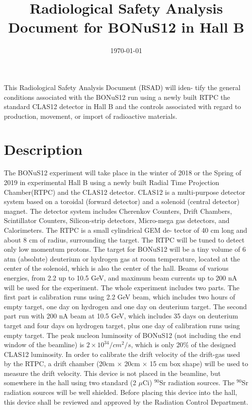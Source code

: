 \documentclass[12pt]{article}
\begin{document}
\title{Radiological Safety Analysis Document for
BONuS12 in Hall B}




\date \today
%
\maketitle

This Radiological Safety Analysis Document (RSAD) will iden-
tify the general conditions associated with the BONuS12 run using
a newly built RTPC the standard CLAS12 detector in Hall B and
the controls associated with regard to production, movement, or
import of radioactive materials. 

\section{Description}
The BONuS12 experiment will take place in the winter of 2018 or the
Spring of 2019 in experimental Hall B using a newly built Radial Time 
Projection Chamber(RTPC) and the CLAS12 detector. CLAS12 is a multi-purpose
detector system based on a toroidal (forward detector) and a solenoid (central 
detector) magnet. The detector system includes Cherenkov Counters,
Drift Chambers, Scintillator Counters, Silicon-strip detectors, Micro-mega
gas detectors, and Calorimeters. The RTPC is a small cylindrical GEM de-
tector of 40 cm long and about 8 cm of radius, surrounding the target. The
RTPC will be tuned to detect only low momentum protons. The target for
BONuS12 will be a tiny volume of 6 atm (absolute) deuterium or hydrogen
gas at room temperature, located at the center of the solenoid, which is also
the center of the hall. Beams of various energies, from 2.2 up to 10.5 GeV, and
maximum beam currents up to 200 nA will be used for the experiment.
The whole experiment includes two parts. The first part is calibration
runs using 2.2 GeV beam, which includes two hours of empty target, one day
on hydrogen and one day on deuterium target. The second part run with
200 nA beam at 10.5 GeV, which includes 35 days on deuterium target and
four days on hydrogen target, plus one day of calibration runs using empty
target. The peak nucleon luminosity of BONuS12 (not including the end window
of the beamline) is $2\times 10^{34}/cm^{2}/s$, which is only 20\% of the 
designed CLAS12 luminosity. In order to calibrate the drift velocity of the 
drift-gas used by the RTPC, a drift chamber (20cm $\times$ 20cm $\times$ 15 cm 
box shape) will be used to measure the drift velocity. This device is not 
placed in the beamline, but somewhere in
the hall using two standard (2 $\mu$Ci) $^{90}$Sr radiation sources. The 
$^{90}$Sr radiation sources will be well shielded. Before placing this device 
into the hall, this device shall be reviewed and approved by the Radiation 
Control Department.
\end{document}
